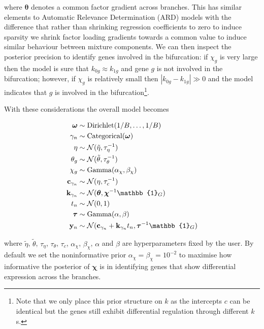 where $\bm \theta$ denotes a common factor gradient across branches. This has similar elements to Automatic Relevance Determination (ARD) models %
with the difference that rather than shrinking regression coefficients to zero to induce sparsity we shrink factor loading gradients towards a common value to induce similar behaviour between mixture components. We can then inspect the posterior precision %
to identify genes involved in the bifurcation: if $\chi_g$ is very large then the model is sure that $k_{0g} \approx k_{1g}$ and gene $g$ is not involved in the bifurcation; however, if $\chi_g$ is relatively small then $|k_{0g} - k_{1g}| \gg 0$ and the model indicates that $g$ is involved in the bifurcation\footnote{Note that we only place this prior structure on $k$ as the intercepts $c$ can be identical but the genes still exhibit differential regulation through different $k$s.}.

With these considerations the overall model becomes

\begin{equation} \label{eq:mfamodel}
\begin{aligned}
\bm \omega & \sim \text{Dirichlet}(1 / B, \ldots, 1 / B) \\
\gamma_n & \sim \text{Categorical}(\bm \omega) \\
\eta & \sim \norm(\tilde{\eta}, \tau_\eta^{-1}) \\
\theta_g & \sim \norm(\tilde{\theta}, \tau_\theta^{-1}) \\
\chi_g & \sim \mathrm{Gamma}(\alpha_\chi, \beta_\chi) \\
\cgi & \sim \norm(\eta, \tau_c^{-1}) \\
\kgi & \sim \norm(\bm \theta, \bm \chi^{-1} \mathbb{1}_G) \\
t_n & \sim \norm(0, 1) \\
\btau & \sim \mathrm{Gamma}(\alpha, \beta) \\
\by_n & \sim \norm(\cgi + \kgi t_n, \btau^{-1} \mathbb{1}_G)
\end{aligned}
\end{equation}

where $\tilde{\eta}$, $\tilde{\theta}$, $\tau_\eta$, $\tau_\theta$, $\tau_c$, $\alpha_\chi$, $\beta_\chi$, $\alpha$ and $\beta$ are hyperparameters fixed by the user. By default we set the noninformative prior $\alpha_\chi = \beta_\chi = 10^{-2}$ to maximise how informative the posterior of $\bm \chi$ is in identifying genes that show differential expression across the branches.


